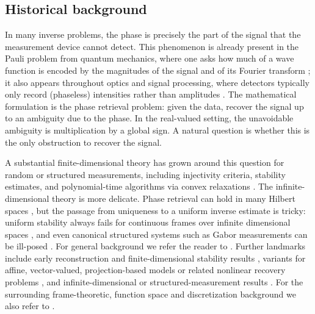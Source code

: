 \documentclass[11pt]{amsart}
\numberwithin{equation}{section}
\theoremstyle{definition}
\theoremstyle{remark}
\begin{document}
\subsection{Historical background} In many inverse problems, the phase is precisely the part of the signal that the
measurement device cannot detect.  This phenomenon is already present in the
Pauli problem from quantum mechanics, where one asks how much of a wave function
is encoded by the magnitudes of the signal and of its Fourier transform
\cite{MR3552875,MR3256781,pauli1933allgemeinen,ramos-sousa-pauli}; it also appears throughout
optics and signal processing, where detectors typically only record (phaseless) intensities
rather than amplitudes
\cite{MR3069958,eldar2014stability,grohs2020survey,sanz1984phase}.  The
mathematical formulation is the phase retrieval problem: given the data, recover the signal up to an ambiguity due to the phase.  In the real-valued setting, the unavoidable
ambiguity is multiplication by a global sign. A natural question is whether
this is the only obstruction to recover the signal.  

A substantial finite-dimensional theory has grown around this question for random or structured measurements, including injectivity criteria, stability estimates, and polynomial-time algorithms via convex relaxations
\cite{bandeira2014saving,MR3260258,MR3069958,DB,eldar2014stability,MR3746047,KS}.
The infinite-dimensional theory is more delicate.  Phase retrieval can hold in
many Hilbert spaces \cite{cahill2016infinite,freeman2025cahill}, but the passage from uniqueness to a
uniform inverse estimate is tricky: uniform stability always fails for continuous
frames over infinite dimensional spaces \cite{AG-continuous-frames}, and even canonical structured systems
such as Gabor measurements can be  ill-posed
\cite{alaifari2021gabor,alaifari2025cheeger,grohs2021stable,steinerberger2020stability}. For general background we refer the reader to \cite{grohs2020survey}.
Further landmarks include early reconstruction and finite-dimensional stability
results
\cite{balan2013,bandeira2014saving,MR3260258,MR3069958,DB,eldar2014stability,MR3746047,KS},
variants for affine, vector-valued, projection-based models or related nonlinear recovery problems
\cite{abdalla2025sharp,bartusel2021phase,casazza2017weak,casazza2013,akrami2021note,casazza2017norm,chen2019phase},
and infinite-dimensional or structured-measurement results
\cite{localphase,calderbank2022stable,MR4298599}.
For the surrounding frame-theoretic, function space and discretization background we also refer
to
\cite{CHL,DPSTT,FG-atomic,fg22,MR3901674,kashin2021sampling,luef2021gaussian,NOU,MR0423039}.
\end{document}
